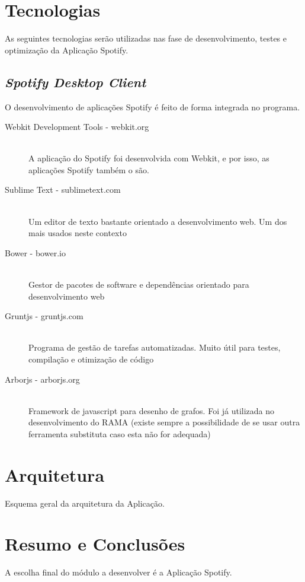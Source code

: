 

\section{Tecnologias} %
\label{sec:tecnologias}

  As seguintes tecnologias serão utilizadas nas fase de desenvolvimento, testes e optimização da Aplicação Spotify.

  \subsection{\emph{Spotify Desktop Client}} %
  \label{sub:subsection_name}
    O desenvolvimento de aplicações Spotify é feito de forma integrada no programa.
  

  \begin{description}
    \item[Webkit Development Tools - webkit.org] \hfill \\
      A aplicação do Spotify foi desenvolvida com Webkit, e por isso, as aplicações Spotify também o são.
    \item[Sublime Text - sublimetext.com] \hfill \\
      Um editor de texto bastante orientado a desenvolvimento web. Um dos mais usados neste contexto
    \item[Bower - bower.io] \hfill \\
      Gestor de pacotes de software e dependências orientado para desenvolvimento web
    \item[Gruntjs - gruntjs.com] \hfill \\
      Programa de gestão de tarefas automatizadas. Muito útil para testes, compilação e otimização de código
    \item[Arborjs - arborjs.org] \hfill \\
      Framework de javascript para desenho de grafos. Foi já utilizada no desenvolvimento do RAMA (existe sempre a possibilidade de se usar outra ferramenta substituta caso esta não for adequada)
  \end{description}


\section{Arquitetura} %
\label{sec:arquitetura}

  Esquema geral da arquitetura da Aplicação.


\section{Resumo e Conclusões}

  A escolha final do módulo a desenvolver é a Aplicação Spotify.
